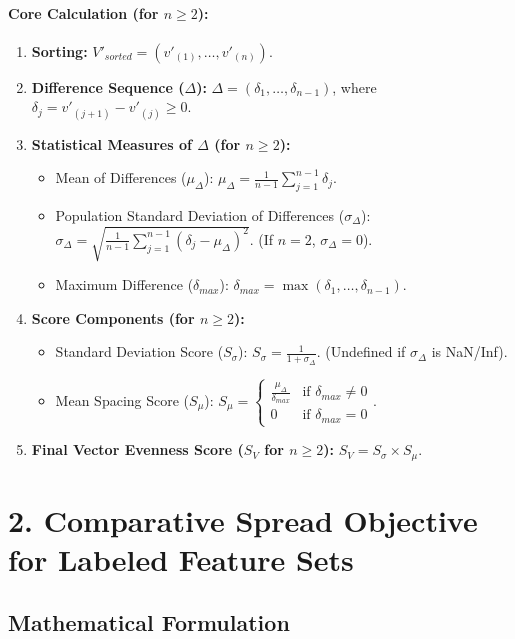 \documentclass{article}
\begin{document}
\paragraph{Core Calculation (for $n \ge 2$):}
\begin{enumerate}
    \item \textbf{Sorting:} $V'_{sorted} = (v'_{(1)}, \dots, v'_{(n)})$.
    \item \textbf{Difference Sequence ($\Delta$):} $\Delta = (\delta_1, \dots, \delta_{n-1})$, where $\delta_j = v'_{(j+1)} - v'_{(j)} \ge 0$.
    \item \textbf{Statistical Measures of $\Delta$ (for $n \ge 2$):}
    \begin{itemize}
        \item Mean of Differences ($\mu_{\Delta}$): $\mu_{\Delta} = \frac{1}{n-1} \sum_{j=1}^{n-1} \delta_j$.
        \item Population Standard Deviation of Differences ($\sigma_{\Delta}$): $\sigma_{\Delta} = \sqrt{\frac{1}{n-1} \sum_{j=1}^{n-1} (\delta_j - \mu_{\Delta})^2}$. (If $n=2$, $\sigma_{\Delta}=0$).
        \item Maximum Difference ($\delta_{max}$): $\delta_{max} = \max(\delta_1, \dots, \delta_{n-1})$.
    \end{itemize}
    \item \textbf{Score Components (for $n \ge 2$):}
    \begin{itemize}
        \item Standard Deviation Score ($S_{\sigma}$): $S_{\sigma} = \frac{1}{1 + \sigma_{\Delta}}$. (Undefined if $\sigma_{\Delta}$ is NaN/Inf).
        \item Mean Spacing Score ($S_{\mu}$): $S_{\mu} = \begin{cases} \frac{\mu_{\Delta}}{\delta_{max}} & \text{if } \delta_{max} \neq 0 \\ 0 & \text{if } \delta_{max} = 0 \end{cases}$.
    \end{itemize}
    \item \textbf{Final Vector Evenness Score ($S_V$ for $n \ge 2$):} $S_V = S_{\sigma} \times S_{\mu}$.
\end{enumerate}

\section*{2. Comparative Spread Objective for Labeled Feature Sets}

\subsection*{Mathematical Formulation}
\end{document}
